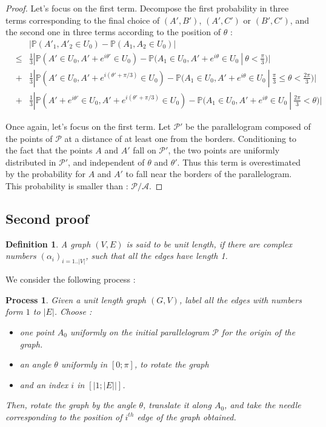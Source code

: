 \documentclass[a4paper,11pt]{article}
\newtheorem{definition}{Definition}
\newtheorem{process}{Process}
\begin{document}
\begin{proof}
Let's focus on the first term. 
Decompose the first probability in three terms corresponding to the final choice of $(A',B')$, $(A',C')$ or $(B',C')$, and the second one in three terms according to the position of $\theta$ :
\begin{eqnarray*}
& & | \mathbb{P}(A'_1 , A'_2 \in U_0) - \mathbb{P}(A_1 , A_2 \in U_0) | \\
&\leq& \frac{1}{3} | \mathbb{P}(A' \in U_0 , A' + e^{i \theta '} \in U_0) - \mathbb{P}(A_1 \in U_0 , A' + e^{i \theta} \in U_0 \ |\  \theta < \frac{\pi}{3} ) | \\
&+& \frac{1}{3} | \mathbb{P}(A' \in U_0 , A' + e^{i(\theta ' + \pi / 3 ) } \in U_0) - \mathbb{P}(A_1 \in U_0 , A' + e^{i \theta} \in U_0 \ |\  \frac{\pi}{3} \leq \theta < \frac{2 \pi}{3} ) | \\
&+& \frac{1}{3} | \mathbb{P}(A' + e^{i \theta '} \in U_0 , A' + e^{i(\theta ' + \pi / 3 ) } \in U_0) - \mathbb{P}(A_1 \in U_0 , A' + e^{i \theta} \in U_0 \ | \  \frac{2 \pi}{3} < \theta ) |
\end{eqnarray*}

Once again, let's focus on the first term. Let $\mathcal{P'}$ be the parallelogram  composed of the points of  $\mathcal{P}$ at a distance of at least one from the borders. Conditioning to the fact that the points $A$ and $A'$ fall on $\mathcal{P'}$, the two points are uniformly distributed in $\mathcal{P'}$, and independent of $\theta$ and $\theta'$. Thus this term is overestimated by the probability for $A$ and $A'$ to fall near the borders of the parallelogram. This probability is smaller than : $\mathcal{P}/\mathcal{A}$.

\end{proof}


\subsection*{Second proof}
\begin{definition}
A graph $(V,E) $ is said to be unit length, if there are complex numbers $(\alpha_i)_{i=1..|V|}$, such that all the edges have length 1.
\end{definition}
We consider the following process : \\
\begin{process}
Given a unit length graph $(G,V)$, label all the edges with numbers form $1$ to $|E|$. Choose : 
\begin{itemize}
\item one point $A_0$ uniformly on the initial parallelogram $\mathcal{P}$ for the origin of the graph.
\item an angle $\theta$ uniformly in $[0;\pi]$, to rotate the graph
\item and an index $i$ in $[|1;|E||]$.
\end{itemize}
Then, rotate the graph by the angle $\theta$, translate it along $A_0$, and take the needle corresponding to the position of $i^{th}$ edge of the graph obtained. 
\end{process}
\vspace{1 cm} 
\end{document}
